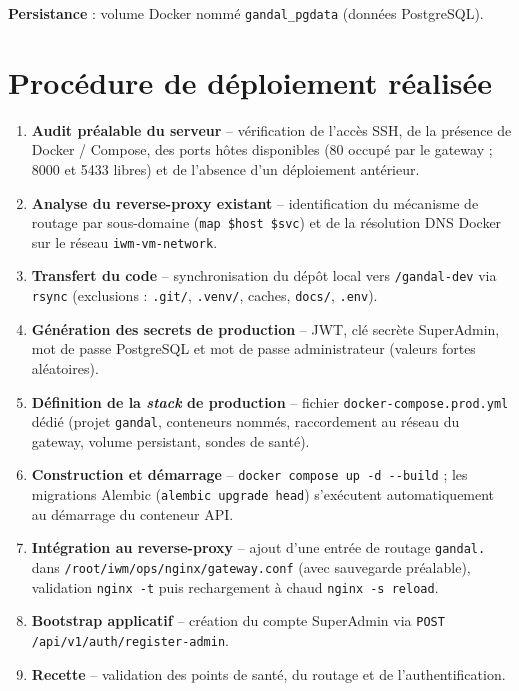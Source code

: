 \documentclass[11pt,a4paper]{article}
\newcommand{\code}[1]{\texttt{\small #1}}
\begin{document}
\medskip
\noindent\textbf{Persistance} : volume Docker nommé \code{gandal\_pgdata} (données
PostgreSQL).

\section{Procédure de déploiement réalisée}

\begin{enumerate}[label=\textbf{\arabic*.}]
  \item \textbf{Audit préalable du serveur} -- vérification de l'accès SSH, de la
        présence de Docker / Compose, des ports hôtes disponibles (80 occupé par le
        gateway ; 8000 et 5433 libres) et de l'absence d'un déploiement antérieur.
  \item \textbf{Analyse du reverse-proxy existant} -- identification du mécanisme de
        routage par sous-domaine (\code{map \$host \$svc}) et de la résolution DNS
        Docker sur le réseau \code{iwm-vm-network}.
  \item \textbf{Transfert du code} -- synchronisation du dépôt local vers
        \code{/gandal-dev} via \code{rsync} (exclusions : \code{.git/}, \code{.venv/},
        caches, \code{docs/}, \code{.env}).
  \item \textbf{Génération des secrets de production} -- JWT, clé secrète SuperAdmin,
        mot de passe PostgreSQL et mot de passe administrateur (valeurs fortes
        aléatoires).
  \item \textbf{Définition de la \emph{stack} de production} -- fichier
        \code{docker-compose.prod.yml} dédié (projet \code{gandal}, conteneurs nommés,
        raccordement au réseau du gateway, volume persistant, sondes de santé).
  \item \textbf{Construction et démarrage} -- \code{docker compose up -d -{}-build} ;
        les migrations Alembic (\code{alembic upgrade head}) s'exécutent automatiquement
        au démarrage du conteneur API.
  \item \textbf{Intégration au reverse-proxy} -- ajout d'une entrée de routage
        \code{gandal.} dans \code{/root/iwm/ops/nginx/gateway.conf} (avec sauvegarde
        préalable), validation \code{nginx -t} puis rechargement à chaud
        \code{nginx -s reload}.
  \item \textbf{Bootstrap applicatif} -- création du compte SuperAdmin via
        \code{POST /api/v1/auth/register-admin}.
  \item \textbf{Recette} -- validation des points de santé, du routage et de
        l'authentification.
\end{enumerate}
\end{document}

